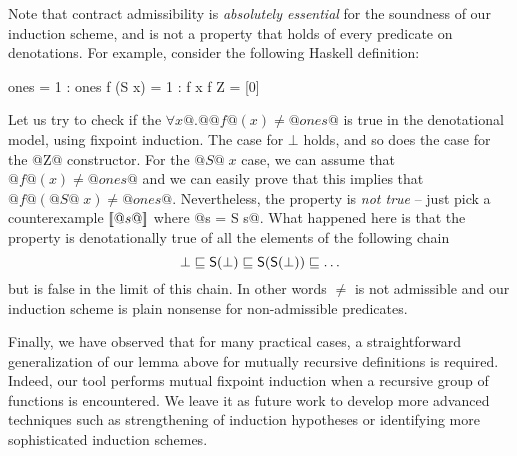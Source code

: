 Note that contract admissibility is {\em absolutely essential} for the
soundness of our induction scheme, and is not a property that holds of
every predicate on denotations. For example, consider the following
Haskell definition:
\begin{code}
  ones = 1 : ones
  f (S x) = 1 : f x
  f Z     = [0]
\end{code}
Let us try to check if the $\forall x @.@ @f@(x) \neq @ones@$ is true in 
the denotational model, using fixpoint induction. The case for $\bot$ holds, 
and so does the case for the @Z@ constructor. For the $@S@\;x$ case, we can 
assume that $@f@(x) \neq @ones@$ and we can easily prove that this implies that
$@f@(@S@\;x) \neq @ones@$. Nevertheless, the property is {\em not true} -- just pick 
a counterexample $[\![@s@]\!]$ where @s = S s@. What happened here is that the property 
is denotationally true of all the elements of the following chain
\[ \bot \sqsubseteq \mathsf{S}(\bot) \sqsubseteq \mathsf{S}(\mathsf{S}(\bot)) \sqsubseteq \ldots \] 
but is false in the limit of this chain. In other words $\neq$ is not admissible and our 
induction scheme is plain nonsense for non-admissible predicates. 

Finally, we have observed that for many practical cases, a
straightforward generalization of our lemma above for mutually
recursive definitions is required. Indeed, our tool performs mutual
fixpoint induction when a recursive group of functions is
encountered. We leave it as future work to develop more advanced
techniques such as strengthening of induction hypotheses or
identifying more sophisticated induction schemes.



